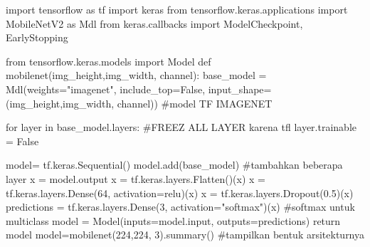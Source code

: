 \documentclass[
  letterpaper,
  DIV=11,
  numbers=noendperiod]{scrreprt}
\newenvironment{Shaded}{\begin{snugshade}}{\end{snugshade}}
\newcommand{\BuiltInTok}[1]{\textcolor[rgb]{0.00,0.23,0.31}{#1}}
\newcommand{\CommentTok}[1]{\textcolor[rgb]{0.37,0.37,0.37}{#1}}
\newcommand{\ControlFlowTok}[1]{\textcolor[rgb]{0.00,0.23,0.31}{#1}}
\newcommand{\DecValTok}[1]{\textcolor[rgb]{0.68,0.00,0.00}{#1}}
\newcommand{\FloatTok}[1]{\textcolor[rgb]{0.68,0.00,0.00}{#1}}
\newcommand{\ImportTok}[1]{\textcolor[rgb]{0.00,0.46,0.62}{#1}}
\newcommand{\KeywordTok}[1]{\textcolor[rgb]{0.00,0.23,0.31}{#1}}
\newcommand{\NormalTok}[1]{\textcolor[rgb]{0.00,0.23,0.31}{#1}}
\newcommand{\OperatorTok}[1]{\textcolor[rgb]{0.37,0.37,0.37}{#1}}
\newcommand{\StringTok}[1]{\textcolor[rgb]{0.13,0.47,0.30}{#1}}
\newcommand{\VariableTok}[1]{\textcolor[rgb]{0.07,0.07,0.07}{#1}}
\begin{document}
\begin{Shaded}
\begin{Highlighting}[]
\ImportTok{import}\NormalTok{ tensorflow }\ImportTok{as}\NormalTok{ tf }
\ImportTok{import}\NormalTok{ keras }
\ImportTok{from}\NormalTok{ tensorflow.keras.applications }\ImportTok{import}\NormalTok{ MobileNetV2 }\ImportTok{as}\NormalTok{ Mdl}
\ImportTok{from}\NormalTok{ keras.callbacks }\ImportTok{import}\NormalTok{ ModelCheckpoint, EarlyStopping}

\ImportTok{from}\NormalTok{ tensorflow.keras.models }\ImportTok{import}\NormalTok{ Model}
\KeywordTok{def}\NormalTok{ mobilenet(img\_height,img\_width, channel):}
\NormalTok{    base\_model }\OperatorTok{=}\NormalTok{ Mdl(weights}\OperatorTok{=}\StringTok{"imagenet"}\NormalTok{, include\_top}\OperatorTok{=}\VariableTok{False}\NormalTok{, input\_shape}\OperatorTok{=}\NormalTok{(img\_height,img\_width, channel)) }\CommentTok{\#model TF IMAGENET}

    \ControlFlowTok{for}\NormalTok{ layer }\KeywordTok{in}\NormalTok{ base\_model.layers: }\CommentTok{\#FREEZ ALL LAYER karena tfl}
\NormalTok{        layer.trainable }\OperatorTok{=} \VariableTok{False}
    
\NormalTok{    model}\OperatorTok{=}\NormalTok{ tf.keras.Sequential()}
\NormalTok{    model.add(base\_model) }\CommentTok{\#tambahkan beberapa layer}
\NormalTok{    x }\OperatorTok{=}\NormalTok{ model.output}
\NormalTok{    x }\OperatorTok{=}\NormalTok{ tf.keras.layers.Flatten()(x)}
\NormalTok{    x }\OperatorTok{=}\NormalTok{ tf.keras.layers.Dense(}\DecValTok{64}\NormalTok{, activation}\OperatorTok{=}\StringTok{\textquotesingle{}relu\textquotesingle{}}\NormalTok{)(x)}
\NormalTok{    x }\OperatorTok{=}\NormalTok{ tf.keras.layers.Dropout(}\FloatTok{0.5}\NormalTok{)(x)}
\NormalTok{    predictions }\OperatorTok{=}\NormalTok{ tf.keras.layers.Dense(}\DecValTok{3}\NormalTok{, activation}\OperatorTok{=}\StringTok{"softmax"}\NormalTok{)(x) }\CommentTok{\#softmax untuk multiclass}
\NormalTok{    model }\OperatorTok{=}\NormalTok{ Model(inputs}\OperatorTok{=}\NormalTok{model.}\BuiltInTok{input}\NormalTok{, outputs}\OperatorTok{=}\NormalTok{predictions)}
    \ControlFlowTok{return}\NormalTok{ model}
\NormalTok{model}\OperatorTok{=}\NormalTok{mobilenet(}\DecValTok{224}\NormalTok{,}\DecValTok{224}\NormalTok{, }\DecValTok{3}\NormalTok{).summary() }\CommentTok{\#tampilkan bentuk arsitekturnya  }
\end{Highlighting}
\end{Shaded}
\end{document}

